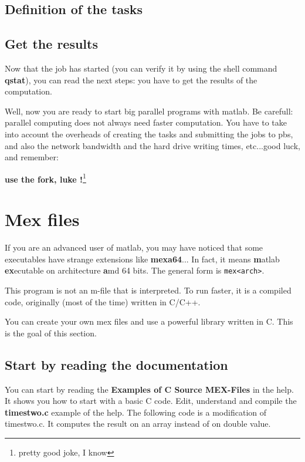 \documentclass{emse-exo}
\begin{document}
\subsection{Definition of the tasks}



\subsection{Get the results}
Now that the job has started (you can verify it by using the shell command \textbf{qstat}), you can read the next steps: you have to get the results of the computation.



Well, now you are ready to start big parallel programs with matlab. Be carefull: parallel computing does not always need faster computation. You have to take into account the overheads of creating the tasks and submitting the jobs to pbs, and also the network bandwidth and the hard drive writing times, etc...good luck, and remember:

\textbf{use the fork, luke !}\footnote{pretty good joke, I know}

\section{Mex files}
If you are an advanced user of matlab, you may have noticed that some \matlabregistered{} executables have strange extensions like \textbf{mexa64}... In fact, it means \textbf{m}atlab \textbf{ex}ecutable on architecture \textbf{a}md 64 bits. The general form is \verb!mex<arch>!.

This program is not an m-file that is interpreted. To run faster, it is a compiled code, originally (most of the time) written in C/C++.

You can create your own mex files and use a powerful library written in C. This is the goal of this section.

\subsection{Start by reading the \matlabregistered{} documentation}
You can start by reading the \textbf{Examples of C Source MEX-Files} in the \matlabregistered{} help. It shows you how to start with a basic C code. Edit, understand and compile the \textbf{timestwo.c} example of the \matlabregistered{} help. The following code is a modification of timestwo.c. It computes the result on an array instead of on double value.
\end{document}
